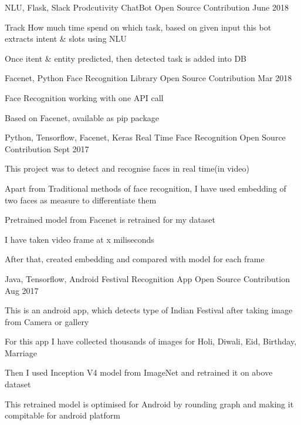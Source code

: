 \begin{cventries}
  \cventry
    {NLU, Flask, Slack} %
    {Prodcutivity ChatBot} %
    {Open Source Contribution} %
    {June 2018} %
    {
      \begin{cvitems} %
        \item {Track How much time spend on which task, based on given input this bot extracts intent \& slots using NLU}
        \item {Once itent \& entity predicted, then detected task is added into DB}
      \end{cvitems}
    }


    \cventry
    {Facenet, Python} %
    {Face Recognition Library} %
    {Open Source Contribution} %
    {Mar 2018} %
    {
      \begin{cvitems} %
        \item {Face Recognition working with one API call}
        \item {Based on Facenet, available as pip package}
      \end{cvitems}
    }

    \cventry
    {Python, Tensorflow, Facenet, Keras} %
    {Real Time Face Recognition} %
    {Open Source Contribution} %
    {Sept 2017} %
    {
      \begin{cvitems} %
        \item {This project was to detect and recognise faces in real time(in video)}
        \item {Apart from Traditional methods of face recognition, I have used embedding of two faces as measure to differentiate them}
        \item {Pretrained model from Facenet is retrained for my dataset}
        \item {I have taken video frame at x miliseconds}
        \item {After that, created embedding and compared with model for each frame}
      \end{cvitems}
    }

  \cventry
    {Java, Tensorflow, Android} %
    {Festival Recognition App} %
    {Open Source Contribution} %
    {Aug 2017} %
    {
      \begin{cvitems} %
        \item {This is an android app, which detects type of Indian Festival after taking image from Camera or gallery}
        \item {For this app I have collected thousands of images for Holi, Diwali, Eid, Birthday, Marriage}
        \item {Then I used Inception V4 model from ImageNet and retrained it on above dataset}
        \item {This retrained model is optimised for Android by rounding graph and making it compitable for android platform}
      \end{cvitems}
    }


\end{cventries}
